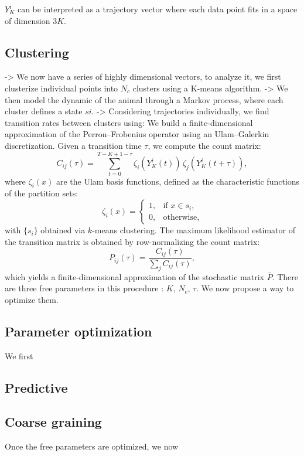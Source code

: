 $Y_K^i$ can be interpreted as a trajectory vector where each data point fits in a space of dimension $3K$.


\subsection{Clustering}

-> We now have a series of highly dimensional vectors, to analyze it, we first clusterize individual points into $N_c$ clusters using a K-means algorithm.
-> We then model the dynamic of the animal through a Markov process, where each cluster defines a state $si$. 
-> Considering trajectories individually, we find transition rates between clusters using:
We build a finite-dimensional approximation of the Perron–Frobenius operator using an Ulam–Galerkin discretization. Given a transition time \( \tau \), we compute the count matrix:
\[
C_{ij}(\tau) = \sum_{t=0}^{T-K+1 - \tau} \zeta_i(Y_{K}^i(t)) \, \zeta_j(Y_{K}^i(t + \tau)),
\]
where \( \zeta_i(x) \) are the Ulam basis functions, defined as the characteristic functions of the partition sets:
\[
\zeta_i(x) =
\begin{cases}
1, & \text{if } x \in s_i, \\
0, & \text{otherwise},
\end{cases}
\]
with \( \{s_i\} \) obtained via \( k \)-means clustering. The maximum likelihood estimator of the transition matrix is obtained by row-normalizing the count matrix:
\[
P_{ij}(\tau) = \frac{C_{ij}(\tau)}{\sum_j C_{ij}(\tau)},
\]
which yields a finite-dimensional approximation of the stochastic matrix $\bar{P}$. There are three free parameters in this procedure : $K$, $N_c$, $\tau$. We now propose a way to optimize them.

\subsection{Parameter optimization}

We first 



\subsection{Predictive }

\subsection{Coarse graining}

Once the free parameters are optimized, we now 







